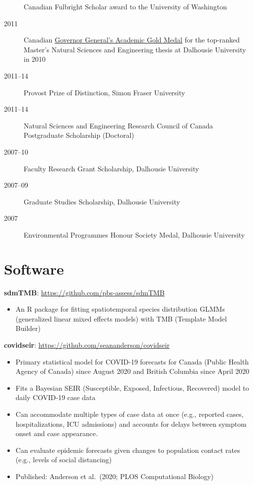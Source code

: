 \begin{description}
Canadian Fulbright Scholar award to the University of Washington
\item[2011]
Canadian \href{http://goo.gl/nA1zE}{Governor General's Academic Gold
Medal} for the top-ranked Master's Natural Sciences and Engineering
thesis at Dalhousie University in 2010
\item[2011--14]
Provost Prize of Distinction, Simon Fraser University
\item[2011--14]
Natural Sciences and Engineering Research Council of Canada Postgraduate
Scholarship (Doctoral)
\item[2007--10]
Faculty Research Grant Scholarship, Dalhousie University
\item[2007--09]
Graduate Studies Scholarship, Dalhousie University
\item[2007]
Environmental Programmes Honour Society Medal, Dalhousie University
\end{description}

\hypertarget{software}{%
\section{Software}\label{software}}


\textbf{sdmTMB}: \url{https://github.com/pbs-assess/sdmTMB}

\begin{itemize}
\tightlist
\item
  An R package for fitting spatiotemporal species distribution GLMMs
  (generalized linear mixed effects models) with TMB (Template Model
  Builder)
\end{itemize}

\textbf{covidseir}: \url{https://github.com/seananderson/covidseir}

\begin{itemize}
\tightlist
\item
  Primary statistical model for COVID-19 forecasts for Canada (Public
  Health Agency of Canada) since August 2020 and British Columbia since
  April 2020
\item
  Fits a Bayesian SEIR (Susceptible, Exposed, Infectious, Recovered)
  model to daily COVID-19 case data
\item
  Can accommodate multiple types of case data at once (e.g., reported
  cases, hospitalizations, ICU admissions) and accounts for delays
  between symptom onset and case appearance.
\item
  Can evaluate epidemic forecasts given changes to population contact
  rates (e.g., levels of social distancing)
\item
  Published: Anderson et al.\ (2020; PLOS Computational Biology)
\end{itemize}

